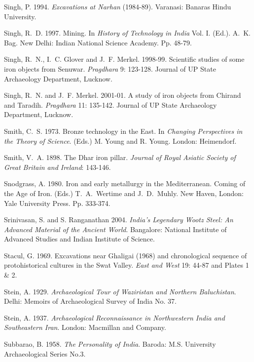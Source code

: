 \begin{thebibliography}{99}
 Singh, P. 1994. \textit{Excavations at Narhan} (1984-89). Varanasi: Banaras Hindu University.

 Singh, R.~D. 1997. Mining. In \textit{History of Technology in India} Vol. I. (Ed.). A.~K. Bag. New Delhi: Indian National Science Academy. Pp. 48-79.

 Singh, R.~N., I.~C. Glover and J.~F. Merkel. 1998-99. Scientific studies of some iron objects from Senuwar. \textit{Pragdhara} 9: 123-128. Journal of UP State Archaeology Department, Lucknow. 

 Singh, R.~N. and J.~F. Merkel. 2001-01. A study of iron objects from Chirand and Taradih. \textit{Pragdhara} 11: 135-142. Journal of UP State Archaeology Department, Lucknow.

 Smith, C.~S. 1973. Bronze technology in the East. In \textit{Changing Perspectives in the Theory of Science}. (Eds.) M. Young and R. Young. London: Heimendorf.

 Smith, V.~A. 1898. The Dhar iron pillar. \textit{Journal of Royal Asiatic Society of Great Britain and Ireland}: 143-146. 

 Snodgrass, A. 1980. Iron and early metallurgy in the Mediterranean. Coming of the Age of Iron. (Eds.) T.~A.~Wertime and J.~D.~Muhly. New Haven, London: Yale University Press. Pp. 333-374.

 Srinivasan, S. and S. Ranganathan 2004. \textit{India’s Legendary Wootz Steel: An Advanced Material of the Ancient World}. Bangalore: National Institute of Advanced Studies and Indian Institute of Science.

 Stacul, G. 1969. Excavations near Ghaligai (1968) and chronological sequence of protohistorical cultures in the Swat Valley. \textit{East and West} 19: 44-87 and Plates 1 \& 2. 

 Stein, A. 1929. \textit{Archaeological Tour of Waziristan and Northern Baluchistan}. Delhi: Memoirs of Archaeological Survey of India No. 37. 

 Stein, A. 1937. \textit{Archaeological Reconnaissance in Northwestern India and Southeastern Iran}. London: Macmillan and Company.

 Subbarao, B. 1958. \textit{The Personality of India}. Baroda: M.S. University Archaeological Series No.3. 


\end{thebibliography}
